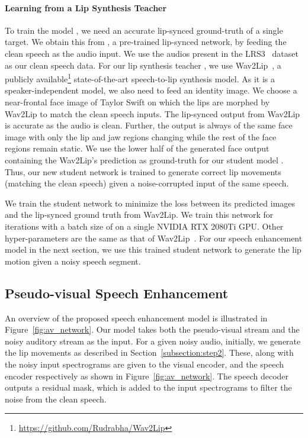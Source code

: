 \documentclass[10pt,twocolumn,letterpaper]{article}
\begin{document}
\paragraph{Learning from a Lip Synthesis Teacher}
To train the model , we need an accurate lip-synced ground-truth of a single target. We obtain this from , a pre-trained lip-synced network, by feeding the clean speech  as the audio input. We use the audios present in the LRS3~\cite{Afouras18d} dataset as our clean speech data. For our lip synthesis teacher , we use Wav2Lip~\cite{wav2lip:2020}, a publicly available\footnote{\url{https://github.com/Rudrabha/Wav2Lip}} state-of-the-art speech-to-lip synthesis model. As it is a speaker-independent model, we also need to feed an identity image. We choose a near-frontal face image of Taylor Swift on which the lips are morphed by Wav2Lip to match the clean speech inputs. The lip-synced output from Wav2Lip is accurate as the audio is clean. Further, the output is always of the same face image with only the lip and jaw regions changing while the rest of the face regions remain static. We use the lower half of the generated face output containing the Wav2Lip's prediction as ground-truth for our student model . Thus, our new student network is trained to generate correct lip movements (matching the clean speech) given a noise-corrupted input of the same speech. 

We train the student network to minimize the  loss between its predicted images and the lip-synced ground truth from Wav2Lip. We train this network for  iterations with a batch size of  on a single NVIDIA RTX 2080Ti GPU. Other hyper-parameters are the same as that of Wav2Lip~\cite{wav2lip:2020}. For our speech enhancement model in the next section, we use this trained student network to generate the lip motion given a noisy speech segment.
 


\subsection{Pseudo-visual Speech Enhancement}
\label{subsection:step3}

An overview of the proposed speech enhancement model is illustrated in Figure~\ref{fig:av_network}. Our model takes both the pseudo-visual stream and the noisy auditory stream as the input. For a given noisy audio, initially, we generate the lip movements as described in Section~\ref{subsection:step2}. These, along with the noisy input spectrograms are given to the visual encoder, and the speech encoder respectively as shown in Figure~\ref{fig:av_network}. The speech decoder outputs a residual mask, which is added to the input spectrograms to filter the noise from the clean speech.
\end{document}
